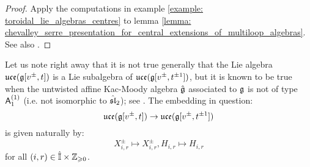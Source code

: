             \begin{proof}
                Apply the computations in example \ref{example: toroidal_lie_algebras_centres} to lemma \ref{lemma: chevalley_serre_presentation_for_central_extensions_of_multiloop_algebras}. See also \cite[Remark 4.5]{guay_nakajima_wendlandt_affine_yangian_vertex_representations_and_PBW}.
            \end{proof}
        \begin{remark}
            Let us note right away that it is not true generally that the Lie algebra $\uce(\g[v^{\pm}, t])$ is a Lie subalgebra of $\uce(\g[v^{\pm}, t^{\pm 1}])$, but it is known to be true when the untwisted affine Kac-Moody algebra $\hat{\g}$ associated to $\g$ is not of type $\sfA_1^{(1)}$ (i.e. not isomorphic to $\hat{\sl}_2$); see \cite[Corollary 4.6]{guay_nakajima_wendlandt_affine_yangian_vertex_representations_and_PBW}. The embedding in question:
                $$\uce(\g[v^{\pm}, t]) \to \uce(\g[v^{\pm}, t^{\pm 1}])$$
            is given naturally by:
                $$X_{i, r}^{\pm} \mapsto X_{i, r}^{\pm}, H_{i, r} \mapsto H_{i, r}$$
            for all $(i, r) \in \hat{\simpleroots} \x \Z_{\geq 0}$.
        \end{remark}